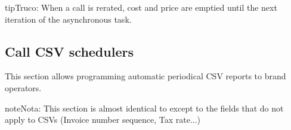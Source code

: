\documentclass[letterpaper,10pt,spanish]{sphinxmanual}
\begin{document}
\begin{notice}{tip}{Truco:}
When a call is rerated, cost and price are emptied until the next iteration of the asynchronous task.
\end{notice}


\subsection{Call CSV schedulers}
\label{administration_portal/brand/calls/call_csv_schedulers:call-csv-schedulers}\label{administration_portal/brand/calls/call_csv_schedulers::doc}\label{administration_portal/brand/calls/call_csv_schedulers:id1}
This section allows programming automatic periodical CSV reports to brand operators.

\begin{notice}{note}{Nota:}
This section is almost identical to {\hyperref[administration_portal/brand/invoicing/invoice_schedulers:invoice\string-schedulers]{}} except to the
fields that do not apply to CSVs (Invoice number sequence, Tax rate...)
\end{notice}
\end{document}
